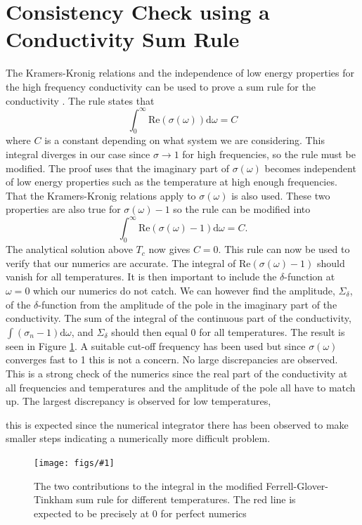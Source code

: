 \documentclass[12pt]{report}
\renewcommand{\d}{\ensuremath{\mathrm{d}}}
\newcommand{\re}{\ensuremath{\mathrm{Re}}}
\newcommand{\fig}[2]{
\begin{figure}
\centering
\texttt{[image: figs/\#1]}
\caption{#2}
\end{figure}
}
\begin{document}
\section{Consistency Check using a Conductivity Sum Rule}
The Kramers-Kronig relations and the independence of low energy properties for the high frequency conductivity can be used to prove a sum rule for the conductivity \cite{PhysRev.109.1398}. The rule states that
\begin{equation}
 \int_0^\infty\re(\sigma(\omega))\d\omega=C
\end{equation}
where $C$ is a constant depending on what system we are considering. This integral diverges in our case since $\sigma\rightarrow1$ for high frequencies, so the rule must be modified. The proof uses that the imaginary part of $\sigma(\omega)$ becomes independent of low energy properties such as the temperature at high enough frequencies. That the Kramers-Kronig relations apply to $\sigma(\omega)$ is also used. These two properties are also true for $\sigma(\omega)-1$ so the rule can be modified into
\begin{equation}
 \int_0^\infty\re(\sigma(\omega)-1)\d\omega=C.
\end{equation}
The analytical solution above $T_c$ now gives $C=0$. This rule can now be used to verify that our numerics are accurate. The integral of $\re(\sigma(\omega)-1)$ should vanish for all temperatures. It is then important to include the $\delta$-function at $\omega=0$ which our numerics do not catch. We can however find the amplitude, $\Sigma_\delta$, of the $\delta$-function from the amplitude of the pole in the imaginary part of the conductivity. The sum of the integral of the continuous part of the conductivity, $\int(\sigma_n-1)\d \omega$, and $\Sigma_\delta$ should then equal 0 for all temperatures. The result is seen in Figure \ref{f:sum}. A suitable cut-off frequency has been used but since $\sigma(\omega)$ converges fast to 1 this is not a concern. No large discrepancies are observed. This is a strong check of the numerics since the real part of the conductivity at all frequencies and temperatures and the amplitude of the pole all have to match up. The largest discrepancy is observed for low temperatures,
 
this is expected since the numerical integrator there has been observed to make smaller steps indicating a numerically more difficult problem.

\fig{sum_rule_a20}{The two contributions to the integral in the modified Ferrell-Glover-Tinkham sum rule for different temperatures. The red line is expected to be precisely at 0 for perfect numerics\label{f:sum}}
\end{document}
